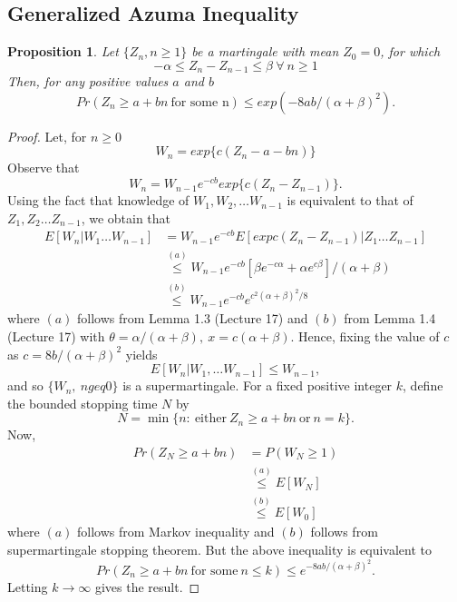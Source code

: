 \documentclass[a4paper,10pt]{article}
\theoremstyle{plain}
\newtheorem{prop}[thm]{Proposition}
\theoremstyle{definition}
\theoremstyle{remark}
\begin{document}
\subsection{Generalized Azuma Inequality}
\begin{prop}
Let $\{Z_n,n \geq 1\}$ be a martingale with mean $Z_0=0$, for which
\begin{equation*}
-\alpha \leq Z_n-Z_{n-1} \leq \beta~ \forall ~n \geq 1
\end{equation*}
Then, for any positive values $a$ and $b$
\begin{equation*}
\label{GenAzumaLemma}
Pr(Z_n \geq a+bn ~ \text{for some n}) \leq exp(-8ab/({\alpha+\beta})^2).
\end{equation*}
\end{prop}
\begin{proof}
Let, for $n \geq 0$
\begin{equation*}
W_n = exp\{c(Z_n-a-bn)\}
\end{equation*}
Observe that
\begin{equation*}
W_n = W_{n-1}e^{-cb}exp\{c(Z_n-Z_{n-1})\}.
\end{equation*}
Using the fact that knowledge of $W_1,W_2, \hdots W_{n-1}$ is equivalent to that of $Z_1,Z_2 \hdots Z_{n-1}$, we obtain that 
\begin{eqnarray*}
E[W_n|W_1 \hdots W_{n-1}]&=W_{n-1}e^{-cb}E[exp{c(Z_n-Z_{n-1})}|Z_1 \hdots Z_{n-1}]\\
& \stackrel{(a)}{\leq} W_{n-1}e^{-cb}[\beta e^{-c\alpha} + \alpha e^{c\beta}]/(\alpha+\beta) \\
 & \stackrel{(b)}{\leq} W_{n-1}e^{-cb}e^{c^2{(\alpha+\beta)}^2/8}
\end{eqnarray*}
where $(a)$ follows from Lemma 1.3 (Lecture 17) and $(b)$ from Lemma 1.4 (Lecture 17) with $\theta=\alpha/(\alpha+\beta),~x=c(\alpha+\beta)$. Hence, fixing the value of $c$ as $c=8b/{(\alpha+\beta)}^2$ yields 
\begin{equation}
E[W_n|W_1, \hdots W_{n-1}] \leq W_{n-1},
\end{equation}
and so $\{W_n,~ n geq 0\}$ is a supermartingale. For a fixed positive integer $k$, define the bounded stopping time $N$ by 
\begin{equation*}
N= \min\{n: ~\text{either}~ Z_n \geq a+bn ~ \text{or}~ n=k \}.
\end{equation*} 
Now,
\begin{eqnarray*}
Pr(Z_N \geq a+bn)&=P(W_N \geq 1)\\
&\stackrel{(a)}{\leq} E[W_N]\\
& \stackrel{(b)}{\leq} E[W_0]
\end{eqnarray*}
where $(a)$ follows from Markov inequality and $(b)$ follows from supermartingale stopping theorem. But the above inequality is equivalent to
\begin{equation*}
Pr(Z_n \geq a+bn ~ \text{for some}~ n \leq k) \leq e^{-8ab/{(\alpha+\beta)}^2}.
\end{equation*}
Letting $k \rightarrow \infty$ gives the result.
\end{proof}
\end{document}
